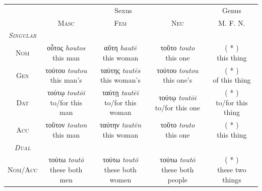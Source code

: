 \documentclass[10pt,a4paper,notitlepage]{article}
\newcommand{\tsc}[1]{\textsc{#1}}
\newcommand*{\grc}[1]{\fontspec{Inter}#1\rmfamily}
\newcommand{\trc}[1]{\textit{\fontspec{Tinos}#1}}
\begin{document}
    \begin{table}[H]
        \begin{tabular}{c|ccc|c}
            & \multicolumn{3}{c|}{Sexus} & Genus \\
            & \tsc{Masc} & \tsc{Fem} & \tsc{Neu} & \tsc{M. F. N.} \\
        \hline
            \emph{\tsc{Singular}} & & & & \\
            \tsc{Nom} & \makecell{\grc{οὗτος} \trc{houtos} \\ \small this man} & \makecell{\grc{αὕτη} \trc{hautē} \\ \small this woman} & \makecell{\grc{τοῦτο} \trc{touto} \\ \small this one}  & \makecell{( * ) \\ \small this thing} \\
            \tsc{Gen} & \makecell{\grc{τούτου} \trc{toutou} \\ \small this man's} & \makecell{\grc{ταύτης} \trc{tautēs} \\ \small this woman's} & \makecell{\grc{τούτου} \trc{toutou} \\ \small this one's}  & \makecell{( * ) \\ \small of this thing} \\
            \tsc{Dat} & \makecell{\grc{τούτῳ} \trc{toutōi} \\ \small to/for this man} & \makecell{\grc{ταύτῃ} \trc{tautēi} \\ \small to/for this woman} & \makecell{\grc{τούτῳ} \trc{toutōi} \\ \small to/for this one}  & \makecell{( * ) \\ \small to/for this thing} \\
            \tsc{Acc} & \makecell{\grc{τοῦτον} \trc{touton} \\ \small this man} & \makecell{\grc{ταύτην} \trc{tautēn} \\ \small this woman} & \makecell{\grc{τοῦτο} \trc{touto} \\ \small this one}  & \makecell{( * ) \\ \small this thing} \\
            \hline
            \emph{\tsc{Dual}} & & & & \\
            \tsc{Nom/Acc} & \makecell{\grc{τούτω} \trc{toutō} \\ \small these both men} & \makecell{\grc{τούτω} \trc{toutō} \\ \small these both women} & \makecell{\grc{τούτω} \trc{toutō} \\ \small these both people}  & \makecell{( * ) \\ \small these two things} \\

\end{tabular}
\end{table}
\end{document}
